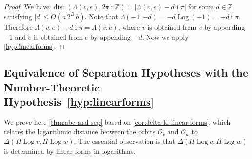 \documentclass[a4paper,USenglish,cleveref,numberwithinsect]{lipics-v2021}
\DeclareMathOperator{\ii}{i}
\DeclareMathOperator{\Log}{Log}
\DeclareMathOperator{\dist}{dist}
\newcommand{\ZZ}{\mathbb{Z}}
\newcommand{\OO}{\ensuremath{\mathcal{O}}}
\numberwithin{equation}{section}
\begin{document}
\begin{proof}
We have $\dist(\Lambda(v,e),2\pi\ii\ZZ) = |\Lambda(v,e)- d \ii\pi|$
for some $d\in\ZZ$ satisfying $|d| \leq O(n\, 2^B \, b)$.
Note that
$\Lambda(-1,-d) = -d \Log(-1) = -d\ii\pi$.
Therefore
$\Lambda(v,e)- d\ii\pi = \Lambda(\tilde{v},\tilde{e})$,
where $\tilde{v}$ is obtained from $v$ by appending $-1$
and $\tilde{e}$ is obtained from $e$ by appending $-d$.
Now we apply \cref{hyp:linearforms}.
\end{proof}

\subsection{Equivalence of Separation Hypotheses with the Number-Theoretic Hypothesis~\ref{hyp:linearforms}}
\label{sec:proof-of-abc-and-sep}
We prove here \cref{thm:abc-and-sep} based on \cref{cor:delta-ld-linear-forms},
which relates the logarithmic distance between the orbits $\OO_v$ and $\OO_w$
to $\Delta(H\Log v,H\Log w)$.
The essential observation is that $\Delta(H\Log v,H\Log w)$
is determined by linear forms in logarithms.
\end{document}
